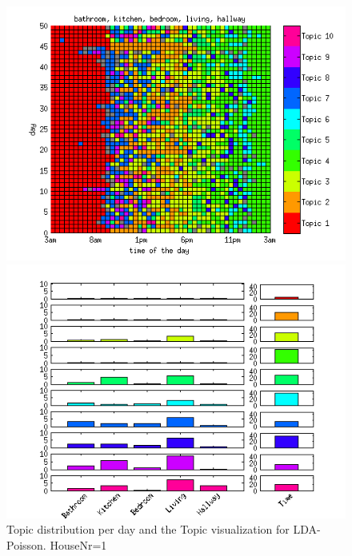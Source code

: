\begin{figure}
 \centering
 \begin{minipage}[b]{0.45\linewidth}
  \centering
  \includegraphics[width=\textwidth]{Pictures/Pois/DayHN1TS48k20.png}
 \end{minipage}
 \begin{minipage}[b]{0.45\linewidth}
  \centering
  \includegraphics[width=\textwidth]{Pictures/Pois/TopHN1TS48k20.png}
 \end{minipage}
 \caption{Topic distribution per day and the Topic visualization for LDA-Poisson. HouseNr=1}
\end{figure}
